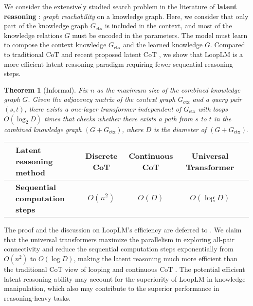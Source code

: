 \documentclass[]{bytedance_seed}
\newcommand{\1}{\mathbf{1}}
\newtheorem{theorem}{Theorem}
\newcommand{\ut}{LoopLM}
\begin{document}
We consider the extensively studied search problem in the literature of \textbf{latent reasoning} \cite{hao2024training, zhu2025reasoning, zhong2025understanding}: \textit{graph reachability} on a knowledge graph. Here, we consider that only part of the knowledge graph $G_{\text{ctx}}$ is included in the context, and most of the knowledge relations $G$ must be encoded in the parameters. The model must learn to compose the context knowledge $G_{\text{ctx}}$ and the learned knowledge $G$. Compared to traditional CoT and recent proposed latent CoT \cite{zhu2025reasoning, hao2024training}, we show that \ut{} is a more efficient latent reasoning paradigm requiring fewer sequential reasoning steps.
\begin{theorem}[Informal]
    Fix $n$ as the maximum size of the combined knowledge graph $G$. Given the adjacency matrix of the context graph $G_{\text{ctx}}$ and a query pair $(s,t)$, there exists a one-layer transformer independent of $G_{\text{ctx}}$ with loops $O(\log_2 D)$ times that checks whether there exists a path from $s$ to $t$ in the combined knowledge graph $(G+G_{\text{ctx}})$, where $D$ is the diameter of $(G+G_{\text{ctx}})$.
    \label{thm:ut_graph_connectivity}
\end{theorem}
\begin{table*}[ht]
\centering
    \vspace{-7pt}
    \begin{tabular}{@{}cl|cccc@{}}
        \toprule
        &\textbf{Latent reasoning method} & {Discrete CoT} & Continuous CoT & Universal Transformer \\
        \midrule
        &\textbf{Sequential computation steps} & {$O(n^2)$} & {$O(D)$} & {$O(\log D)$} \\
        \bottomrule
    \end{tabular}
\end{table*}

The proof and the discussion on \ut{}'s efficiency are deferred to . We claim that the universal transformers maximize the parallelism in exploring all-pair connectivity and reduce the sequential computation steps exponentially from $O(n^2)$ to $O(\log D)$, making the latent reasoning much more efficient than the traditional CoT view of looping \cite{saunshi2025reasoning} and continuous CoT \cite{zhu2025reasoning}. The potential efficient latent reasoning ability may account for the superiority of \ut{} in knowledge manipulation, which also may contribute to the superior performance in reasoning-heavy tasks.
\end{document}
